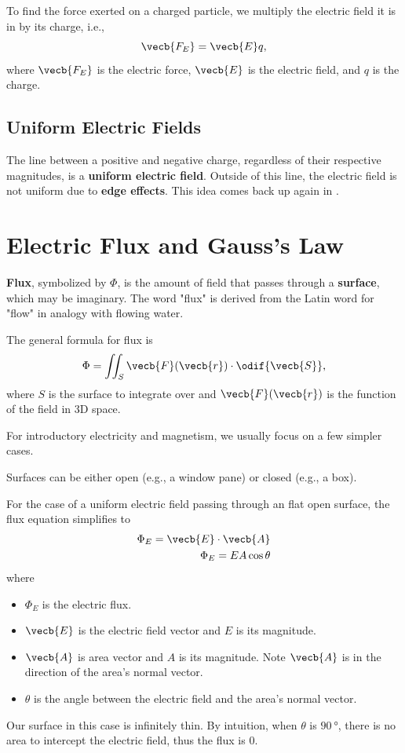 To find the force exerted on a charged particle,
we multiply the electric field it is in by its charge,
i.e.,
\begin{equation}
    \vecb{F_E} = \vecb{E} q,
\end{equation}
where \(\vecb{F_E}\) is the electric force,
\(\vecb{E}\) is the electric field,
and \(q\) is the charge.

\subsection{Uniform Electric Fields}

The line between a positive and negative charge,
regardless of their respective magnitudes,
is a \textbf{uniform electric field}.
Outside of this line,
the electric field is not uniform due to \textbf{edge effects}.
This idea comes back up again in .

\section{Electric Flux and Gauss's Law}

\textbf{Flux}, symbolized by \(\Phi\),
is the amount of field that passes through a \textbf{surface},
which may be imaginary.
The word "flux" is derived from the Latin word for "flow"
in analogy with flowing water.

The general formula for flux is
\begin{equation}
    \Phi = \iint_S \vecb{F}(\vecb{r}) \cdot \odif{\vecb{S}},
\end{equation}
where \(S\) is the surface to integrate over
and \(\vecb{F}(\vecb{r})\) is the function of the field in 3D space.

For introductory electricity and magnetism,
we usually focus on a few simpler cases.

Surfaces can be either open (e.g., a window pane) or closed (e.g., a box).

For the case of a uniform electric field passing through an flat open surface,
the flux equation simplifies to
\begin{equation}
    \begin{aligned}
        \Phi_E = \vecb{E} \cdot \vecb{A} \\
        \Phi_E = E A \cos\theta
    \end{aligned}
\end{equation}
where
\begin{itemize}
    \item \(\Phi_E\) is the electric flux.
    \item \(\vecb{E}\) is the electric field vector and \(E\) is its magnitude.
    \item \(\vecb{A}\) is area vector and \(A\) is its magnitude.
        Note \(\vecb{A}\) is in the direction of the area's normal vector.
    \item \(\theta\) is the angle between the electric field
        and the area's normal vector.
\end{itemize}
Our surface in this case is infinitely thin.
By intuition, when \(\theta\) is \(\qty{90}{\degree}\),
there is no area to intercept the electric field,
thus the flux is 0.

